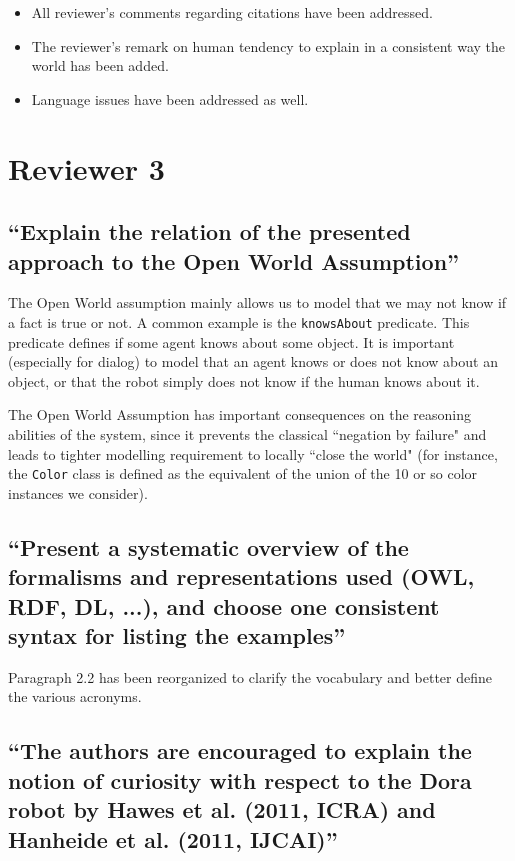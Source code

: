 \documentclass[11pt]{article}
\begin{document}
\begin{itemize}
\item All reviewer's comments regarding citations have been addressed.
\item The reviewer's remark on human tendency to explain in a consistent way the world has been added.
\item Language issues have been addressed as well.
\end{itemize}

\section{Reviewer 3}

\subsection{``Explain the relation of the presented approach to the Open World
Assumption''}

The Open World assumption mainly allows us to model that we may not know if a
fact is true or not. A common example is the {\tt knowsAbout} predicate. This
predicate defines if some agent knows about some object. It is important
(especially for dialog) to model that an agent knows or  does not know about an
object, or that the robot simply does not know if the human knows about it.

The Open World Assumption has important consequences on the reasoning
abilities of the system, since it prevents the classical ``negation by 
failure" and leads to tighter modelling requirement to locally ``close the
world" (for instance, the {\tt Color} class is defined as the equivalent of
the union of the 10 or so color instances we consider).

\subsection{``Present a systematic overview of the formalisms and
representations used (OWL, RDF, DL, ...), and choose one consistent syntax for
listing the examples''}

Paragraph 2.2 has been reorganized to clarify the vocabulary and better
define the various acronyms.

\subsection{``The authors are encouraged to explain the notion of curiosity
with respect to the Dora robot by Hawes et al. (2011, ICRA) and Hanheide et al.
(2011, IJCAI)''}
\end{document}
